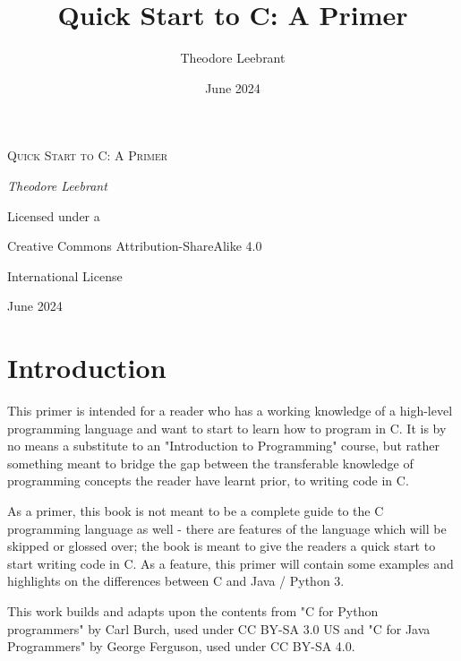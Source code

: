 \documentclass[oneside]{book}
\title{Quick Start to C: A Primer}
\author{Theodore Leebrant}
\date{June 2024}
\begin{document}
\begin{titlepage}
	\centering
	{\Huge \textsc{Quick Start to C: A Primer}\par}
	\vspace{1.5cm}
	{\large \itshape Theodore Leebrant\par}
	\vfill
	{\Large Licensed under a\par
	Creative Commons Attribution-ShareAlike 4.0\par
    International License}

	\vfill


	{\large June 2024\par}
\end{titlepage}

\tableofcontents

\setlength{\parskip}{12pt}

\chapter{Introduction}
This primer is intended for a reader who has a working knowledge of a high-level programming language and want to start to learn how to program in C. It is by no means a substitute to an "Introduction to Programming" course, but rather something meant to bridge the gap between the transferable knowledge of programming concepts the reader have learnt prior, to writing code in C. 

As a primer, this book is not meant to be a complete guide to the C programming language as well - there are features of the language which will be skipped or glossed over; the book is meant to give the readers a quick start to start writing code in C. As a feature, this primer will contain some examples and highlights on the differences between C and Java / Python 3.

This work builds and adapts upon the contents from "C for Python programmers" by Carl Burch, used under CC BY-SA 3.0 US and "C for Java Programmers" by George Ferguson, used under CC BY-SA 4.0.
\end{document}
